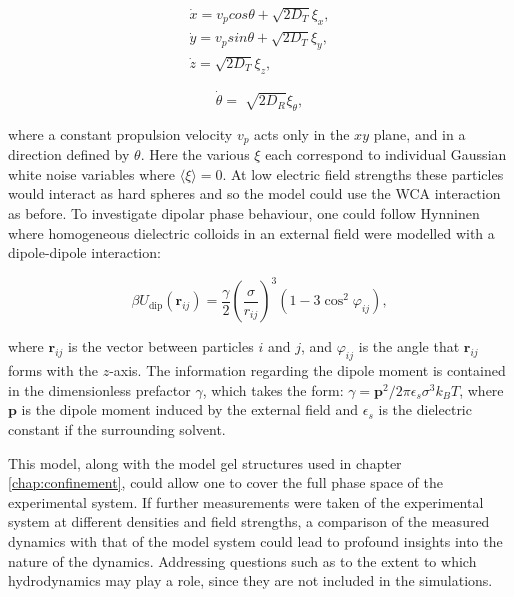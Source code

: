 \begin{equation}
\begin{aligned}
	\dot{x} = v_p cos\theta + \sqrt{2D_{T}}\xi_{x}, \\  
	\dot{y} = v_psin\theta + \sqrt{2D_{T}}\xi_{y}, \\ 
	\dot{z} = \sqrt{2D_{T}}\xi_{z},
\end{aligned}	
\end{equation}

\begin{equation}
\dot{\theta} = \sqrt[]{2D_{R}}\xi_{\theta},
\end{equation}

\noindent where a constant propulsion velocity $v_p$ acts only in the $xy$ plane, and in a direction defined by $\theta$. Here the various $\xi$ each correspond to individual Gaussian white noise variables where $\langle \xi \rangle = 0$. At low electric field strengths these particles would interact as hard spheres and so the model could use the WCA interaction as before. To investigate dipolar phase behaviour, one could follow Hynninen \etal \cite{hynninen2005} where homogeneous dielectric colloids in an external field were modelled with a dipole-dipole interaction:

\begin{equation}
\beta U_{\mathrm{dip}}\left(\mathbf{r}_{i j}\right)=\frac{\gamma}{2}\left(\frac{\sigma}{r_{i j}}\right)^{3}\left(1-3 \cos ^{2} \varphi_{i j}\right),
\end{equation}

\noindent where $\mathbf{r}_{ij}$ is the vector between particles $i$ and $j$, and $\varphi_{ij}$ is the angle that $\mathbf{r}_{ij}$ forms with the $z$-axis. The information regarding the dipole moment is contained in the dimensionless prefactor $\gamma$, which takes the form: $\gamma = \mathbf{p}^{2} / 2 \pi \epsilon_{s} \sigma^{3} k_{B} T$, where $\mathbf{p}$ is the dipole moment induced by the external field and $\epsilon_s$ is the dielectric constant if the surrounding solvent. 

This model, along with the model gel structures used in chapter \ref{chap:confinement}, could allow one to cover the full phase space of the experimental system. If further measurements were taken of the experimental system at different densities and field strengths, a comparison of the measured dynamics with that of the model system could lead to profound insights into the nature of the dynamics. Addressing questions such as to the extent to which hydrodynamics may play a role, since they are not included in the simulations. 




